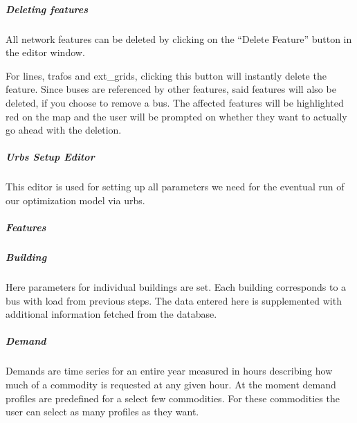 \documentclass[letterpaper,10pt,english]{sphinxmanual}
\begin{document}
\subparagraph{Deleting features}
\label{\detokenize{docs_gui/usage/network_editor:deleting-features}}
\noindent{}

\begin{DUlineblock}{0em}
\item[] All network features can be deleted by clicking on the “Delete Feature” button in the editor window.
\item[] For lines, trafos and ext\_grids, clicking this button will instantly delete the feature. Since buses are referenced by other
features, said features will also be deleted, if you choose to remove a bus. The affected features will be highlighted red on the map
and the user will be prompted on whether they want to actually go ahead with the deletion.
\end{DUlineblock}

\sphinxstepscope


\subparagraph{Urbs Setup Editor}
\label{\detokenize{docs_gui/usage/urbs_setup:urbs-setup-editor}}\label{\detokenize{docs_gui/usage/urbs_setup::doc}}
\begin{DUlineblock}{0em}
\item[] This editor is used for setting up all parameters we need for the eventual run of our optimization model
via urbs.
\end{DUlineblock}


\subparagraph{Features}
\label{\detokenize{docs_gui/usage/urbs_setup:features}}

\subparagraph{Building}
\label{\detokenize{docs_gui/usage/urbs_setup:building}}
\begin{DUlineblock}{0em}
\item[] Here parameters for individual buildings are set. Each building corresponds to a bus with load from previous steps. The data entered here is supplemented with additional information
fetched from the database.
\end{DUlineblock}


\subparagraph{Demand}
\label{\detokenize{docs_gui/usage/urbs_setup:demand}}
\begin{DUlineblock}{0em}
\item[] Demands are time series for an entire year measured in hours describing how much of a commodity is requested at any given hour. At the moment demand profiles are predefined for
a select few commodities. For these commodities the user can select as many profiles as they want.
\end{DUlineblock}
\end{document}
